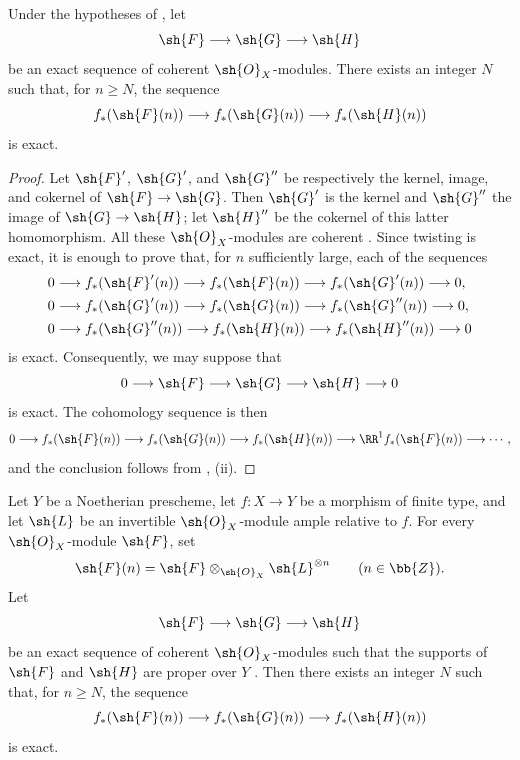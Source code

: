 \begin{corollary}[2.2.3]
\label{III.2.2.3}
Under the hypotheses of , let
\[
  \sh{F}\longrightarrow\sh{G}\longrightarrow\sh{H}
\]
be an exact sequence of coherent $\sh{O}_X$-modules.
There exists an integer $N$ such that, for $n\geq N$, the sequence
\[
  f_*(\sh{F}(n))
  \longrightarrow f_*(\sh{G}(n))
  \longrightarrow f_*(\sh{H}(n))
\]
is exact.
\end{corollary}

\begin{proof}
Let $\sh{F}'$, $\sh{G}'$, and $\sh{G}''$ be respectively the kernel, image, and cokernel of $\sh{F}\to\sh{G}$.
Then $\sh{G}'$ is the kernel and $\sh{G}''$ the image of $\sh{G}\to\sh{H}$; let $\sh{H}''$ be the cokernel of this latter homomorphism.
All these $\sh{O}_X$-modules are coherent .
Since twisting is exact, it is enough to prove that, for $n$ sufficiently large, each of the sequences
\begin{align*}
  0&\longrightarrow f_*(\sh{F}'(n))
    \longrightarrow f_*(\sh{F}(n))
    \longrightarrow f_*(\sh{G}'(n))
    \longrightarrow0,\\
  0&\longrightarrow f_*(\sh{G}'(n))
    \longrightarrow f_*(\sh{G}(n))
    \longrightarrow f_*(\sh{G}''(n))
    \longrightarrow0,\\
  0&\longrightarrow f_*(\sh{G}''(n))
    \longrightarrow f_*(\sh{H}(n))
    \longrightarrow f_*(\sh{H}''(n))
    \longrightarrow0
\end{align*}
is exact.
Consequently, we may suppose that
\[
  0\longrightarrow\sh{F}\longrightarrow\sh{G}
   \longrightarrow\sh{H}\longrightarrow0
\]
is exact.
The cohomology sequence is then
\[
  0\longrightarrow f_*(\sh{F}(n))
  \longrightarrow f_*(\sh{G}(n))
  \longrightarrow f_*(\sh{H}(n))
  \longrightarrow \RR^1f_*(\sh{F}(n))
  \longrightarrow\cdots,
\]
and the conclusion follows from , (ii).
\end{proof}


\begin{corollary}[2.2.4]
\label{III.2.2.4}
Let $Y$ be a Noetherian prescheme, let $f:X\to Y$ be a morphism of finite type, and let $\sh{L}$ be an invertible $\sh{O}_X$-module ample relative to $f$.
For every $\sh{O}_X$-module $\sh{F}$, set
\[
  \sh{F}(n)=\sh{F}\otimes_{\sh{O}_X}\sh{L}^{\otimes n}
  \qquad(n\in\bb{Z}).
\]
Let
\[
  \sh{F}\longrightarrow\sh{G}\longrightarrow\sh{H}
\]
be an exact sequence of coherent $\sh{O}_X$-modules such that the supports of $\sh{F}$ and $\sh{H}$ are proper over $Y$ .
Then there exists an integer $N$ such that, for $n\geq N$, the sequence
\[
  f_*(\sh{F}(n))
  \longrightarrow f_*(\sh{G}(n))
  \longrightarrow f_*(\sh{H}(n))
\]
is exact.
\end{corollary}

